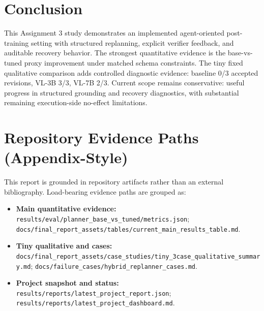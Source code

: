 \documentclass{article}
\begin{document}
\section{Conclusion}
This Assignment 3 study demonstrates an implemented agent-oriented post-training setting with structured replanning, explicit verifier feedback, and auditable recovery behavior. The strongest quantitative evidence is the base-vs-tuned proxy improvement under matched schema constraints. The tiny fixed qualitative comparison adds controlled diagnostic evidence: baseline 0/3 accepted revisions, VL-3B 3/3, VL-7B 2/3. Current scope remains conservative: useful progress in structured grounding and recovery diagnostics, with substantial remaining execution-side no-effect limitations.

\section*{Repository Evidence Paths (Appendix-Style)}
\small
This report is grounded in repository artifacts rather than an external bibliography. Load-bearing evidence paths are grouped as:
\begin{itemize}[leftmargin=*]
  \item \textbf{Main quantitative evidence:} \texttt{results/eval/planner\_base\_vs\_tuned/metrics.json}; \texttt{docs/final\_report\_assets/tables/current\_main\_results\_table.md}.
  \item \textbf{Tiny qualitative and cases:} \texttt{docs/final\_report\_assets/case\_studies/tiny\_3case\_qualitative\_summary.md}; \texttt{docs/failure\_cases/hybrid\_replanner\_cases.md}.
  \item \textbf{Project snapshot and status:} \texttt{results/reports/latest\_project\_report.json}; \texttt{results/reports/latest\_project\_dashboard.md}.
\end{itemize}
\end{document}

